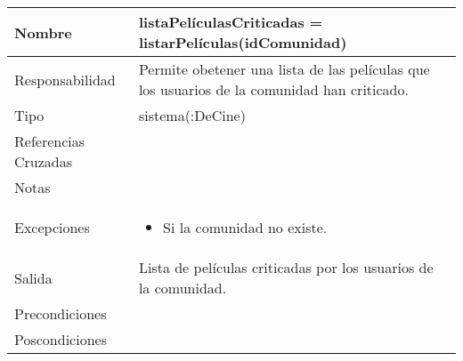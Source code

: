 \documentclass{article}
\begin{document}
\begin{table}[h]
\begin{tabular}{|l|l|l|l|l|l|}
\hline
\multicolumn{2}{|p{3cm}|}{Nombre} & \multicolumn{4}{p{10cm}|}{\textbf{listaPelículasCriticadas = listarPelículas(idComunidad)}}\\
\hline
\multicolumn{2}{|p{3cm}|}{Responsabilidad} & \multicolumn{4}{p{10cm}|}{Permite obetener una lista de las películas que los usuarios de la comunidad han criticado.} \\
\hline
\multicolumn{2}{|p{3cm}|}{Tipo} & \multicolumn{4}{p{10cm}|}{sistema(:DeCine)} \\
\hline
\multicolumn{2}{|p{3cm}|}{Referencias Cruzadas} & \multicolumn{4}{p{10cm}|}{} \\
\hline
\multicolumn{2}{|p{3cm}|}{Notas} & \multicolumn{4}{p{10cm}|}{} \\
\hline
\multicolumn{2}{|p{3cm}|}{Excepciones} & \multicolumn{4}{p{10cm}|}{\begin{itemize}
\item Si la comunidad no existe.
\end{itemize}} \\
\hline
\multicolumn{2}{|p{3cm}|}{Salida} & \multicolumn{4}{p{10cm}|}{Lista de películas criticadas por los usuarios de la comunidad.} \\
\hline
\multicolumn{2}{|p{3cm}|}{Precondiciones} & \multicolumn{4}{p{10cm}|}{} \\
\hline
\multicolumn{2}{|p{3cm}|}{Poscondiciones} & \multicolumn{4}{p{10cm}|}{} \\
\hline
\end{tabular}
\end{table}
\end{document}
